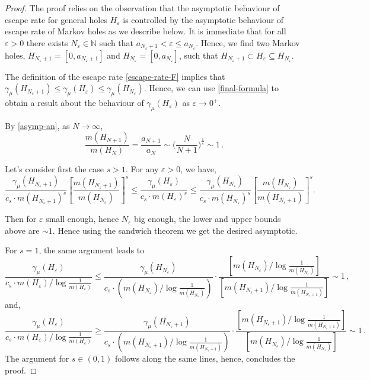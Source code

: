 \documentclass[10pt,a4paper]{amsart}
\newcommand{\N}{\mathbb N}
\newcommand{\eps}{\varepsilon}
\begin{document}
\begin{proof}
The proof relies on the observation that the asymptotic behaviour of escape rate for general holes $H_\eps$ is controlled by the asymptotic behaviour of escape rate of Markov holes as we describe below. It is immediate that for all $\eps>0$ there exists $N_\eps \in \N$ such that $a_{N_\eps+1} < \eps \le a_{N_\eps}$. Hence, we find two Markov holes, $H_{N_\eps+1} = [0,a_{N_\eps+1}]$ and $H_{N_\eps} = [0,a_{N_\eps}]$, such that $H_{N_\eps+1} \subset H_\eps \subseteq H_{N_\eps}$. 

The definition of the escape rate \eqref{escape-rate-F} implies that $\gamma_\mu(H_{N_\eps+1})\le \gamma_\mu(H_\eps)\le \gamma_\mu(H_{N_\eps})$. Hence, we can use \eqref{final-formula} to obtain a result about the behaviour of $\gamma_\mu(H_\eps)$ as $\eps\to 0^+$.

By \eqref{asymp-an}, as $N\to \infty$,
\[
\frac{m(H_{N+1})}{m(H_N)} = \frac{a_{N+1}}{a_N} \sim \Big( \frac{N}{N+1} \Big)^{\frac 1s} \sim 1\, .
\]

Let's consider first the case $s> 1$. For any $\eps >0$, we have,
\[
 \frac{\gamma_\mu(H_{N_\eps+1})}{c_s\cdot m(H_{N_\eps+1})^s}\left[ \frac{m(H_{N_\eps+1})}{m(H_{N_\eps})} \right]^s \le \frac{\gamma_\mu(H_\eps)}{c_s \cdot m(H_\eps)^s} \le \frac{\gamma_\mu(H_{N_\eps})}{c_s\cdot m(H_{N_\eps})^s} \left[ \frac{m(H_{N_\eps})}{m(H_{N_\eps +1})} \right]^s .
\]

Then for $\eps$ small enough, hence $N_\eps$ big enough, the lower and upper bounds above are $\sim 1$. Hence using the sandwich theorem we get the desired asymptotic.
 

For $s=1$, the same argument leads to 
\[
\frac{\gamma_\mu(H_\eps)}{c_s \cdot m(H_\eps)/\log \frac{1}{m(H_\eps)}} \le \frac{\gamma_\mu(H_{N_\eps})}{c_s \cdot \left( m(H_{N_\eps}) / \log \frac{1}{m(H_{N_\eps})} \right)} \cdot \frac{\left[ m(H_{N_\eps}) / \log \frac{1}{m(H_{N_\eps})}\right]}{\left[ m(H_{N_\eps+1}) / \log \frac{1}{m(H_{N_\eps+1})}\right]} \sim 1 \, ,
\]
and,
\[
\frac{\gamma_\mu(H_\eps)}{c_s \cdot m(H_\eps)/\log \frac{1}{m(H_\eps)}} \ge \frac{\gamma_\mu(H_{N_\eps+1})}{c_s \cdot \left( m(H_{N_\eps+1}) / \log \frac{1}{m(H_{N_\eps+1})} \right)} \cdot \frac{\left[ m(H_{N_\eps+1}) / \log \frac{1}{m(H_{N_\eps+1})}\right]}{\left[ m(H_{N_\eps}) / \log \frac{1}{m(H_{N_\eps})}\right]} \sim 1 \,.
\]
The argument for $s\in (0,1)$ follows along the same lines, hence, concludes the proof.
\end{proof}
\end{document}
